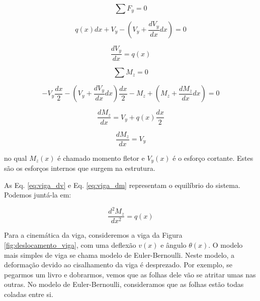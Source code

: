         \begin{equation*}
            \sum F_y = 0
        \end{equation*}

        \begin{equation*}
            q(x)dx + V_y - \left(V_y + \frac{dV_y}{dx}dx\right) = 0
        \end{equation*}

        \begin{equation}
            \frac{dV_y}{dx} = q(x)
            \label{eq:viga_dv}
        \end{equation}

        \begin{equation*}
            \sum M_z = 0
        \end{equation*}

        \begin{equation*}
            -V_y\frac{dx}{2} - \left(V_y + \frac{dV_y}{dx}dx\right)\frac{dx}{2} - M_z + \left(M_z + \frac{dM_z}{dx}dx\right) = 0
        \end{equation*}

        \begin{equation*}
            \frac{dM_z}{dx} = V_y + q(x)\frac{dx}{2}
        \end{equation*}

        \begin{equation}
            \frac{dM_z}{dx} = V_y
            \label{eq:viga_dm}
        \end{equation}

        \noindent no qual $M_z(x)$ é chamado momento fletor e $V_y(x)$ é o esforço cortante. Estes são os esforços internos que surgem na estrutura.

        As Eq. \eqref{eq:viga_dv} e Eq. \eqref{eq:viga_dm} representam o equilíbrio do sistema. Podemos juntá-la em:

        \begin{equation}
            \frac{d^2M_z}{dx^2} = q(x)
            \label{eq:viga_equilibrio}
        \end{equation}

        Para a cinemática da viga, consideremos a viga da Figura \ref{fig:deslocamento_viga}, com uma deflexão $v(x)$ e ângulo $\theta(x)$. O modelo mais simples de viga se chama modelo de Euler-Bernoulli. Neste modelo, a deformação devido ao cisalhamento da viga é desprezado. Por exemplo, se pegarmos um livro e dobrarmos, vemos que as folhas dele vão se atritar umas nas outras. No modelo de Euler-Bernoulli, consideramos que as folhas estão todas coladas entre si.

